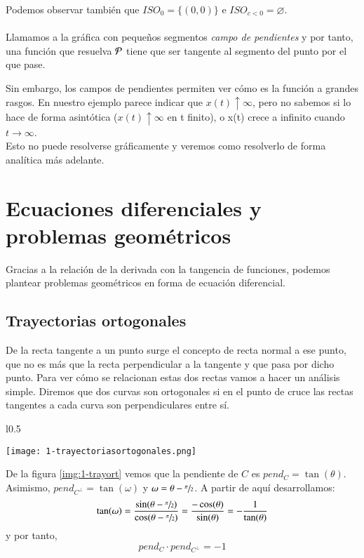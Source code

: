 \begin{eg}
\begin{minipage}[c]{0.65\textwidth}
        Podemos observar también que $ISO_0 = \{(0,0)\}$ e $ISO_{c < 0} = \varnothing$.\\\\ Llamamos a la gráfica con pequeños segmentos \textit{campo de pendientes} y por tanto, una función que resuelva $\P$ tiene que ser tangente al segmento del punto por el que pase.
    \end{minipage}
    Sin embargo, los campos de pendientes permiten ver cómo es la función a grandes rasgos. En nuestro ejemplo parece indicar que $x(t) \uparrow \infty$, pero no sabemos si lo hace de forma asintótica ($x(t) \uparrow \infty$ en t finito), o x(t) crece a infinito cuando $t \rightarrow \infty$.\\
    Esto no puede resolverse gráficamente y veremos como resolverlo de forma analítica más adelante.
\end{eg}

\section{Ecuaciones diferenciales y problemas geom\'{e}tricos}
Gracias a la relación de la derivada con la tangencia de funciones, podemos plantear problemas geométricos en forma de ecuación diferencial.
\subsection{Trayectorias ortogonales}
De la recta tangente a un punto surge el concepto de recta normal a ese punto, que no es más que la recta perpendicular a la tangente y que pasa por dicho punto. Para ver cómo se relacionan estas dos rectas vamos a hacer un análisis simple. Diremos que dos curvas son ortogonales si en el punto de cruce las rectas tangentes a cada curva son perpendiculares entre sí.
\begin{wrapfigure}[20]{l}{0.5\textwidth}
  \begin{center}
    \texttt{[image: 1-trayectoriasortogonales.png]}
  \end{center}
  \caption{Relaciones entre curvas ortogonales}\label{img:1-trayort}
\end{wrapfigure}
De la figura \ref{img:1-trayort} vemos que la pendiente de $C$ es $pend_C = \tan(\theta)$. Asimismo, $pend_{C^{\perp}} = \tan(\omega)$ y $\omega = \theta - \sfrac{\pi}{2}$. A partir de aquí desarrollamos:
$$
    \tan(\omega)=\frac{\sin(\theta-\sfrac{\pi}{2})}{\cos(\theta-\sfrac{\pi}{2})} = \frac{-\cos(\theta)}{\sin(\theta)} = -\frac{1}{\tan(\theta)}
$$
y por tanto,
\begin{equation} \label{eq:pendientes}
    pend_C \cdot pend_{C^{\perp}} = -1
\end{equation}

